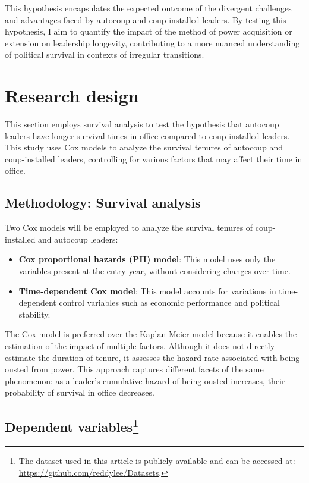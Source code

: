 \documentclass[
  12pt,
]{article}
\begin{document}
This hypothesis encapsulates the expected outcome of the divergent
challenges and advantages faced by autocoup and coup-installed leaders.
By testing this hypothesis, I aim to quantify the impact of the method
of power acquisition or extension on leadership longevity, contributing
to a more nuanced understanding of political survival in contexts of
irregular transitions.

\section{Research design}\label{research-design}

This section employs survival analysis to test the hypothesis that
autocoup leaders have longer survival times in office compared to
coup-installed leaders. This study uses Cox models to analyze the
survival tenures of autocoup and coup-installed leaders, controlling for
various factors that may affect their time in office.

\subsection{Methodology: Survival
analysis}\label{methodology-survival-analysis}

Two Cox models will be employed to analyze the survival tenures of
coup-installed and autocoup leaders:

\begin{itemize}
\item
  \textbf{Cox proportional hazards (PH) model}: This model uses only the
  variables present at the entry year, without considering changes over
  time.
\item
  \textbf{Time-dependent Cox model}: This model accounts for variations
  in time-dependent control variables such as economic performance and
  political stability.
\end{itemize}

The Cox model is preferred over the Kaplan-Meier model because it
enables the estimation of the impact of multiple factors. Although it
does not directly estimate the duration of tenure, it assesses the
hazard rate associated with being ousted from power. This approach
captures different facets of the same phenomenon: as a leader's
cumulative hazard of being ousted increases, their probability of
survival in office decreases.

\subsection[Dependent variables]{\texorpdfstring{Dependent
variables\footnote{The dataset used in this article is publicly
  available and can be accessed at:
  \url{https://github.com/reddylee/Datasets}.}}{Dependent variables}}\label{dependent-variables1}
\end{document}
